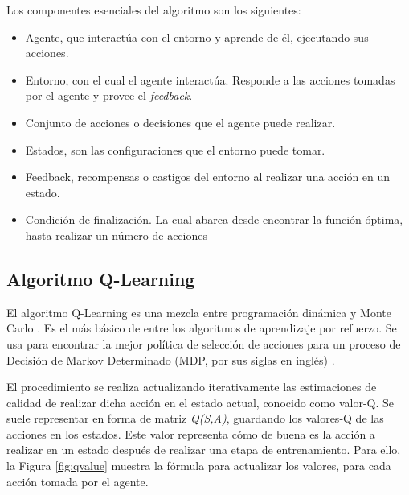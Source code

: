 	\begin{flushleft}
		Los componentes esenciales del algoritmo son los siguientes:
	\end{flushleft}
	\begin{itemize}
		\item Agente, que interactúa con el entorno y aprende de él, ejecutando sus acciones. 
		\item Entorno, con el cual el agente interactúa. Responde a las acciones tomadas por el agente y provee el \textit{feedback}.
		\item Conjunto de acciones o decisiones que el agente puede realizar.
		\item Estados, son las configuraciones que el entorno puede tomar.
		\item Feedback, recompensas o castigos del entorno al realizar una acción en un estado.		
		\item Condición de finalización. La cual abarca desde encontrar la función óptima, hasta realizar un número de acciones 
	\end{itemize}


	\subsection{Algoritmo Q-Learning} 
		El algoritmo Q-Learning es una mezcla entre programación dinámica y Monte Carlo \cite{wang2012monte}. Es el más básico de entre los algoritmos de aprendizaje por refuerzo. Se usa para encontrar la mejor política de selección de acciones para un proceso de Decisión de Markov Determinado (MDP, por sus siglas en inglés) \cite{garcia2013markov}. 
		
		El procedimiento se realiza actualizando iterativamente las estimaciones de calidad de realizar dicha acción en el estado actual, conocido como valor-Q. Se suele representar en forma de matriz \textit{Q(S,A)}, guardando los valores-Q de las acciones en los estados. Este valor representa cómo de buena es la acción a realizar en un estado después de realizar una etapa de entrenamiento. Para ello, la Figura \ref{fig:qvalue} muestra la fórmula para actualizar los valores, para cada acción tomada por el agente.
				
